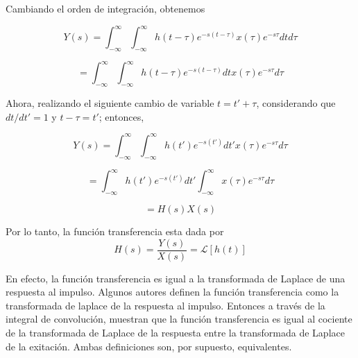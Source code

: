 \documentclass[12pt]{book}
\theoremstyle{definition}
\theoremstyle{remark}
\theoremstyle{plain}
\begin{document}
Cambiando el orden de integración, obtenemos

\begin{equation*}
Y(s) = \int_{- \infty}^{\infty}  \int_{- \infty}^{\infty} h(t- \tau) e^{-s (t-\tau)}  x(\tau)  e^{-s \tau}  d t d \tau 
\end{equation*}

\begin{equation*}
 = \int_{- \infty}^{\infty}  \int_{- \infty}^{\infty} h(t- \tau) e^{-s (t-\tau)} d t  x(\tau)  e^{-s \tau}  d \tau 
\end{equation*}

Ahora, realizando el siguiente cambio de variable $t=t'+ \tau$, considerando que $d t /d t'=1$ y $t- \tau = t'$; entonces,

\begin{equation*}
 Y(s) = \int_{- \infty}^{\infty}  \int_{- \infty}^{\infty} h(t') e^{-s (t')} d t'  x(\tau)  e^{-s \tau}  d \tau 
\end{equation*}

\begin{equation*}
 = \int_{- \infty}^{\infty}   h(t') e^{-s (t')} d t'  \int_{- \infty}^{\infty}  x(\tau)  e^{-s \tau}  d \tau 
\end{equation*}


\begin{equation*}
 = H(s) X(s)
\end{equation*}

Por lo tanto, la función transferencia esta dada por
\begin{equation}
\label{equ305}
 H(s)= \frac{Y(s)}{X(s)}= \mathcal{L} [h(t)]
\end{equation}

En efecto, la función transferencia es igual a la transformada de Laplace de una respuesta al impulso.
Algunos autores definen la función transferencia como la transformada de laplace de la respuesta al impulso. Entonces a través de la integral de convolución, muestran que la función transferencia es igual al cociente de la transformada de Laplace de la respuesta entre la transformada de Laplace de la exitación. Ambas definiciones son, por supuesto, equivalentes.
\end{document}
